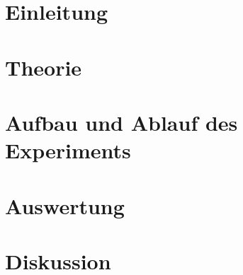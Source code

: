 \documentclass[a4,10pt]{article}
\begin{document}



\tableofcontents
\clearpage


\section{Einleitung}

\section{Theorie}

\clearpage


\section{Aufbau und Ablauf des Experiments}

\clearpage


\section{Auswertung}
%
%

\clearpage


\section{Diskussion}


\clearpage
\end{document}
